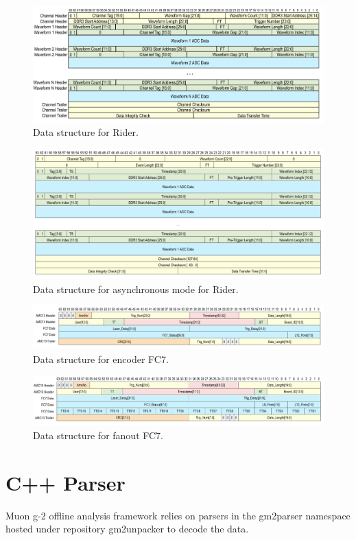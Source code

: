 \begin{figure}[htbp]
\centering
\includegraphics[width=\textwidth]{pics/RiderData.pdf} 
\caption{Data structure for Rider.}\label{fig:RiderData}
\end{figure}

\begin{figure}[htbp]
\centering
\includegraphics[width=\textwidth]{pics/AsyncRiderData.pdf} 
\caption{Data structure for asynchronous mode for Rider.}\label{fig:AsyncRiderData}
\end{figure}

\begin{figure}[htbp]
\centering
\includegraphics[width=\textwidth]{pics/EncoderFC7.pdf} 
\caption{Data structure for encoder FC7.}\label{fig:EncoderFC7}
\end{figure}


\begin{figure}[htbp]
\centering
\includegraphics[width=\textwidth]{pics/FanoutFC7.pdf} 
\caption{Data structure for fanout FC7.}\label{fig:FanoutFC7}
\end{figure}


\section{C++ Parser}
Muon g-2 offline analysis framework relies on parsers in the gm2parser namespace hosted under repository gm2unpacker to decode the data.



